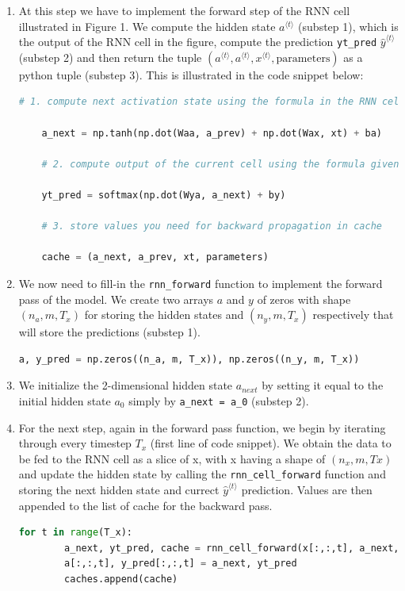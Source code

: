 \documentclass{article}
\def\code#1{\texttt{#1}}
\begin{document}
\begin{enumerate}
	\item At this step we have to implement the forward step of the RNN cell illustrated in Figure 1. We compute the hidden state $a^{\langle t \rangle}$ (substep 1), which is the output of the RNN cell in the figure, compute the prediction \code{yt\_pred} $\hat{y}^{\langle t \rangle}$ (substep 2) and then return the tuple $(a^{\langle t \rangle} , a^{\langle t \rangle} , x^{\langle t \rangle}, \text{parameters})$ as a python tuple (substep 3). This is illustrated in the code snippet below: \\
	 
	\begin{lstlisting}[language=Python]
	# 1. compute next activation state using the formula in the RNN cell figure
	
	a_next = np.tanh(np.dot(Waa, a_prev) + np.dot(Wax, xt) + ba)
	
	# 2. compute output of the current cell using the formula given above   
	
	yt_pred = softmax(np.dot(Wya, a_next) + by) 
	
	# 3. store values you need for backward propagation in cache
	
	cache = (a_next, a_prev, xt, parameters)\end{lstlisting}
	\item We now need to fill-in the \code{rnn\_forward} function to implement the forward pass of the model. We create two arrays $a$ and $y$ of zeros with shape $(n_a , m, T_x )$ for storing the hidden states and $(n_y , m, T_x )$ respectively that will store the predictions (substep 1).

\begin{lstlisting}[language=Python]
	a, y_pred = np.zeros((n_a, m, T_x)), np.zeros((n_y, m, T_x))\end{lstlisting}

    \item We initialize the 2-dimensional hidden state $a_{next}$ by setting it equal to the initial hidden state $a_0$ simply by \code{a\_{next} = a\_0} (substep 2).
    
    \item For the next step, again in the forward pass function, we begin by iterating through every timestep $T_x$ (first line of code snippet). We obtain the data to be fed to the RNN cell as a slice of x, with x having a shape of $(n_x , m, Tx )$ and update the hidden state by calling the \code{rnn\_cell\_forward} function and storing the next hidden state and currect $\hat{y}^{\langle t \rangle}$ prediction. Values are then appended to the list of cache for the backward pass.
    
    \begin{lstlisting}[language=Python]
    for t in range(T_x):
        a_next, yt_pred, cache = rnn_cell_forward(x[:,:,t], a_next, parameters) 
        a[:,:,t], y_pred[:,:,t] = a_next, yt_pred
        caches.append(cache)\end{lstlisting}

\end{enumerate}
\end{document}

